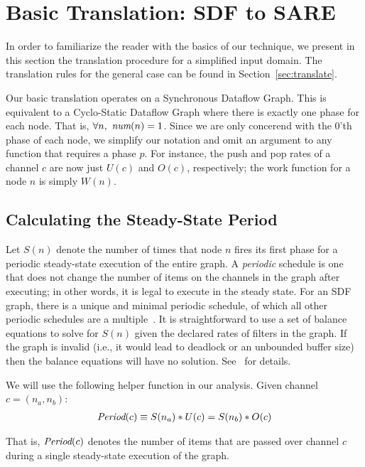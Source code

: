 \section{Basic Translation: SDF to SARE}
\label{sec:simple}

In order to familiarize the reader with the basics of our technique,
we present in this section the translation procedure for a simplified
input domain.  The translation rules for the general case can be found
in Section~\ref{sec:translate}.

Our basic translation operates on a Synchronous Dataflow Graph.  This
is equivalent to a Cyclo-Static Dataflow Graph where there is exactly
one phase for each node.  That is, $\forall n,~\mbox{\it num}(n) = 1$.
Since we are only concerend with the 0'th phase of each node, we
simplify our notation and omit an argument to any function that
requires a phase $p$.  For instance, the push and pop rates of a
channel $c$ are now just $U(c)$ and $O(c)$, respectively; the work
function for a node $n$ is simply $W(n)$.



\subsection{Calculating the Steady-State Period}
\label{sec:balance}

Let $S(n)$ denote the number of times that node $n$ fires its first
phase for a periodic steady-state execution of the entire graph. A
{\it periodic} schedule is one that does not change the number of
items on the channels in the graph after executing; in other words, it
is legal to execute in the steady state.  For an SDF graph, there is a
unique and minimal periodic schedule, of which all other periodic
schedules are a multiple~\cite{leesdf}.  It is straightforward to use
a set of balance equations to solve for $S(n)$ given the declared
rates of filters in the graph.  If the graph is invalid (i.e., it
would lead to deadlock or an unbounded buffer size) then the balance
equations will have no solution.  See~\cite{leesdf} for details.

We will use the following helper function in our analysis.  Given
channel $c = (n_a, n_b)$:
\begin{align*}
\mbox{\it Period}(c) \equiv S(n_a) * U(c) = S(n_b) * O(c)
\end{align*}

That is, $\mbox{\it Period}(c)$ denotes the number of items that are passed
over channel $c$ during a single steady-state execution of the graph.

